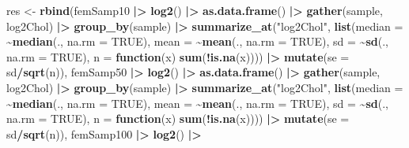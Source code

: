 \documentclass[
  12pt,dutch]{book}
\newenvironment{Shaded}{\begin{snugshade}}{\end{snugshade}}
\newcommand{\AttributeTok}[1]{\textcolor[rgb]{0.13,0.29,0.53}{#1}}
\newcommand{\ConstantTok}[1]{\textcolor[rgb]{0.56,0.35,0.01}{#1}}
\newcommand{\ControlFlowTok}[1]{\textcolor[rgb]{0.13,0.29,0.53}{\textbf{#1}}}
\newcommand{\FunctionTok}[1]{\textcolor[rgb]{0.13,0.29,0.53}{\textbf{#1}}}
\newcommand{\NormalTok}[1]{#1}
\newcommand{\OtherTok}[1]{\textcolor[rgb]{0.56,0.35,0.01}{#1}}
\newcommand{\SpecialCharTok}[1]{\textcolor[rgb]{0.81,0.36,0.00}{\textbf{#1}}}
\newcommand{\StringTok}[1]{\textcolor[rgb]{0.31,0.60,0.02}{#1}}
\theoremstyle{definition}
\theoremstyle{definition}
\theoremstyle{definition}
\theoremstyle{definition}
\theoremstyle{remark}
\begin{document}
\begin{Shaded}
\begin{Highlighting}[]
\NormalTok{res }\OtherTok{\textless{}{-}} \FunctionTok{rbind}\NormalTok{(femSamp10 }\SpecialCharTok{|\textgreater{}}
    \FunctionTok{log2}\NormalTok{() }\SpecialCharTok{|\textgreater{}}
    \FunctionTok{as.data.frame}\NormalTok{() }\SpecialCharTok{|\textgreater{}}
    \FunctionTok{gather}\NormalTok{(sample, log2Chol) }\SpecialCharTok{|\textgreater{}}
    \FunctionTok{group\_by}\NormalTok{(sample) }\SpecialCharTok{|\textgreater{}}
    \FunctionTok{summarize\_at}\NormalTok{(}\StringTok{"log2Chol"}\NormalTok{, }\FunctionTok{list}\NormalTok{(}\AttributeTok{median =} \SpecialCharTok{\textasciitilde{}}\FunctionTok{median}\NormalTok{(.,}
        \AttributeTok{na.rm =} \ConstantTok{TRUE}\NormalTok{), }\AttributeTok{mean =} \SpecialCharTok{\textasciitilde{}}\FunctionTok{mean}\NormalTok{(., }\AttributeTok{na.rm =} \ConstantTok{TRUE}\NormalTok{),}
        \AttributeTok{sd =} \SpecialCharTok{\textasciitilde{}}\FunctionTok{sd}\NormalTok{(., }\AttributeTok{na.rm =} \ConstantTok{TRUE}\NormalTok{), }\AttributeTok{n =} \ControlFlowTok{function}\NormalTok{(x) }\FunctionTok{sum}\NormalTok{(}\SpecialCharTok{!}\FunctionTok{is.na}\NormalTok{(x)))) }\SpecialCharTok{|\textgreater{}}
    \FunctionTok{mutate}\NormalTok{(}\AttributeTok{se =}\NormalTok{ sd}\SpecialCharTok{/}\FunctionTok{sqrt}\NormalTok{(n)), femSamp50 }\SpecialCharTok{|\textgreater{}}
    \FunctionTok{log2}\NormalTok{() }\SpecialCharTok{|\textgreater{}}
    \FunctionTok{as.data.frame}\NormalTok{() }\SpecialCharTok{|\textgreater{}}
    \FunctionTok{gather}\NormalTok{(sample, log2Chol) }\SpecialCharTok{|\textgreater{}}
    \FunctionTok{group\_by}\NormalTok{(sample) }\SpecialCharTok{|\textgreater{}}
    \FunctionTok{summarize\_at}\NormalTok{(}\StringTok{"log2Chol"}\NormalTok{, }\FunctionTok{list}\NormalTok{(}\AttributeTok{median =} \SpecialCharTok{\textasciitilde{}}\FunctionTok{median}\NormalTok{(.,}
        \AttributeTok{na.rm =} \ConstantTok{TRUE}\NormalTok{), }\AttributeTok{mean =} \SpecialCharTok{\textasciitilde{}}\FunctionTok{mean}\NormalTok{(., }\AttributeTok{na.rm =} \ConstantTok{TRUE}\NormalTok{),}
        \AttributeTok{sd =} \SpecialCharTok{\textasciitilde{}}\FunctionTok{sd}\NormalTok{(., }\AttributeTok{na.rm =} \ConstantTok{TRUE}\NormalTok{), }\AttributeTok{n =} \ControlFlowTok{function}\NormalTok{(x) }\FunctionTok{sum}\NormalTok{(}\SpecialCharTok{!}\FunctionTok{is.na}\NormalTok{(x)))) }\SpecialCharTok{|\textgreater{}}
    \FunctionTok{mutate}\NormalTok{(}\AttributeTok{se =}\NormalTok{ sd}\SpecialCharTok{/}\FunctionTok{sqrt}\NormalTok{(n)), femSamp100 }\SpecialCharTok{|\textgreater{}}
    \FunctionTok{log2}\NormalTok{() }\SpecialCharTok{|\textgreater{}}

\end{Highlighting}
\end{Shaded}
\end{document}
